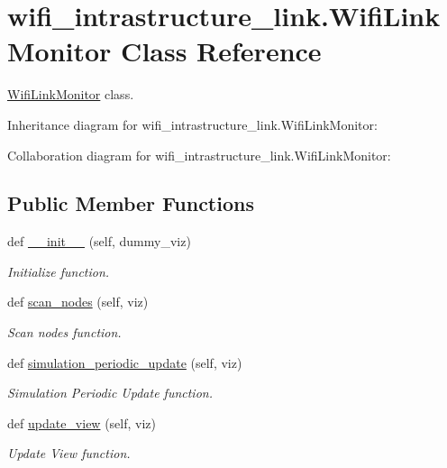 \hypertarget{classwifi__intrastructure__link_1_1WifiLinkMonitor}{}\section{wifi\+\_\+intrastructure\+\_\+link.\+Wifi\+Link\+Monitor Class Reference}
\label{classwifi__intrastructure__link_1_1WifiLinkMonitor}


\hyperlink{classwifi__intrastructure__link_1_1WifiLinkMonitor}{Wifi\+Link\+Monitor} class.  




Inheritance diagram for wifi\+\_\+intrastructure\+\_\+link.\+Wifi\+Link\+Monitor\+:


Collaboration diagram for wifi\+\_\+intrastructure\+\_\+link.\+Wifi\+Link\+Monitor\+:
\subsection*{Public Member Functions}
\begin{DoxyCompactItemize}
\item 
def \hyperlink{classwifi__intrastructure__link_1_1WifiLinkMonitor_a7448d4b24140666f940c9ae0302276b5}{\+\_\+\+\_\+init\+\_\+\+\_\+} (self, dummy\+\_\+viz)
\begin{DoxyCompactList}\small\item\em Initialize function. \end{DoxyCompactList}\item 
def \hyperlink{classwifi__intrastructure__link_1_1WifiLinkMonitor_a122b520d58f83d1f377f5651c56f0d46}{scan\+\_\+nodes} (self, viz)
\begin{DoxyCompactList}\small\item\em Scan nodes function. \end{DoxyCompactList}\item 
def \hyperlink{classwifi__intrastructure__link_1_1WifiLinkMonitor_a4ee5666ab0a4e6ae55c4404bc10935d0}{simulation\+\_\+periodic\+\_\+update} (self, viz)
\begin{DoxyCompactList}\small\item\em Simulation Periodic Update function. \end{DoxyCompactList}\item 
def \hyperlink{classwifi__intrastructure__link_1_1WifiLinkMonitor_abeecede7f3afe83435172b3d8ba080a5}{update\+\_\+view} (self, viz)
\begin{DoxyCompactList}\small\item\em Update View function. \end{DoxyCompactList}\end{DoxyCompactItemize}
